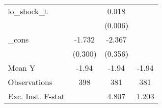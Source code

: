 {\begin{tabular}{l*{3}{c}}
\addlinespace
lo\_shock\_t  &                     &       0.018\sym{***}&                     \\
            &                     &     (0.006)         &                     \\
\addlinespace
\_cons      &      -1.732\sym{***}&      -2.367\sym{***}&                     \\
            &     (0.300)         &     (0.356)         &                     \\
\midrule
Mean Y      &       -1.94         &       -1.94         &       -1.94         \\
Observations&         398         &         381         &         381         \\
Exc. Inst. F-stat&                     &       4.807         &       1.203         \\
\bottomrule
\end{tabular}
}

